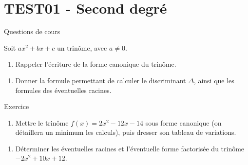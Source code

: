 \documentclass[a4paper,11pt]{article}
\author{Pierquet}
\title{\nomfichier}
\begin{document}
\pagestyle{fancy}

\part{TEST01 - Second degré}

\medskip

\nomprenomtcbox

\medskip

\begin{blocexo}Questions de cours\end{blocexo} %

\medskip

Soit $ax^2+bx+c$ un trinôme, avec $a \neq 0$.

\begin{enumerate}
	\item Rappeler l'écriture de la forme canonique du trinôme.
\end{enumerate}


\begin{enumerate}[resume]
	\item Donner la formule permettant de calculer le discriminant $\Delta$, ainsi que les formules des éventuelles racines.
\end{enumerate}


\medskip

\begin{blocexo}Exercice\end{blocexo} %

\begin{enumerate}
	\item Mettre le trinôme $f(x)=2x^2-12x-14$ sous forme canonique (on détaillera un minimum les calculs), puis dresser son tableau de variations.
\end{enumerate}


\begin{enumerate}[resume]
	\item Déterminer les éventuelles racines et l'éventuelle forme factorisée du trinôme $-2x^2+10x+12$.
\end{enumerate}

\end{document}
